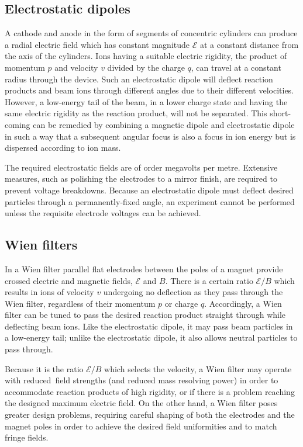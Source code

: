 \documentclass[12pt]{amsart}
\begin{document}
\subsection{Electrostatic dipoles}
A cathode and anode in the form of segments of concentric cylinders can produce a radial electric field which has constant magnitude $\mathcal{E}$  at a constant distance from the axis of the cylinders.   Ions having a suitable electric rigidity, the product of momentum $p$ and velocity $v$ divided by the charge $q$, can travel at a constant radius through the device.   Such an electrostatic dipole will deflect reaction products and beam ions through different angles due to their different velocities.  However, a low-energy tail of the beam, in a lower charge state and having the same electric rigidity as the reaction product, will not be separated.   This short-coming can be remedied by combining a magnetic dipole and electrostatic dipole in such a way that a subsequent angular focus is also a focus in ion energy but is dispersed according to ion mass.  

The required electrostatic fields are of order megavolts per metre.   Extensive measures, such as polishing the electrodes to a mirror finish, are required to prevent voltage breakdowns.   Because an electrostatic dipole must deflect desired particles through a permanently-fixed angle,  an experiment  cannot be performed unless the requisite   electrode voltages can be achieved.  

\subsection{Wien filters}
In a Wien filter parallel flat electrodes between the poles of a magnet provide crossed electric and magnetic fields, $\mathcal{E}$ and $B$.      There is a certain ratio $\mathcal{E}/B$ which results in ions of velocity $v$  undergoing no deflection as they pass through the Wien filter, regardless of their momentum $p$ or charge $q$.    Accordingly, a Wien filter can be tuned to pass the desired reaction product straight through while deflecting beam ions.  Like the electrostatic dipole, it may pass beam particles in  a low-energy tail; unlike the electrostatic dipole, it  also allows   neutral particles to pass through.

Because it is  the ratio $\mathcal{E}/B$ which selects the velocity, a Wien filter may operate with reduced\ field strengths (and reduced mass resolving power)  in order to accommodate reaction products of high rigidity, or if there is a problem reaching the designed maximum electric field.    On the other hand, a Wien filter poses greater design problems, requiring careful shaping of both the electrodes and the magnet poles in order to achieve the desired field uniformities and to match fringe fields.
\end{document}

